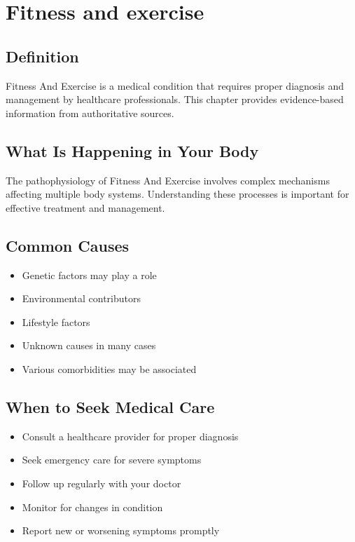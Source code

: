 
\chapter{Fitness and exercise}

\section*{Definition}
Fitness And Exercise is a medical condition that requires proper diagnosis and management by healthcare professionals. This chapter provides evidence-based information from authoritative sources.

\section*{What Is Happening in Your Body}
The pathophysiology of Fitness And Exercise involves complex mechanisms affecting multiple body systems. Understanding these processes is important for effective treatment and management.

\section*{Common Causes}
\begin{itemize}
  \item Genetic factors may play a role
  \item Environmental contributors
  \item Lifestyle factors
  \item Unknown causes in many cases
  \item Various comorbidities may be associated
\end{itemize}

\section*{When to Seek Medical Care}
\begin{itemize}
  \item Consult a healthcare provider for proper diagnosis
  \item Seek emergency care for severe symptoms
  \item Follow up regularly with your doctor
  \item Monitor for changes in condition
  \item Report new or worsening symptoms promptly
\end{itemize}

